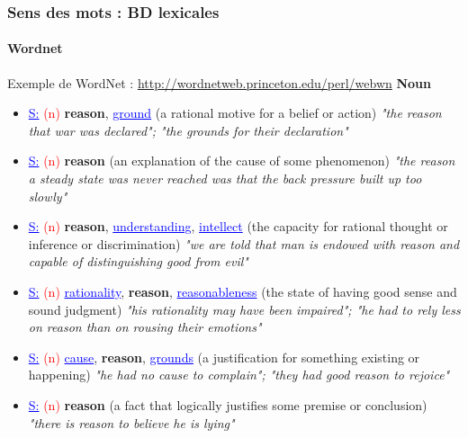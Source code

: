 \documentclass[xcolor=table]{beamer}
\begin{document}
\begin{frame}
\frametitle{Sens des mots : BD lexicales}
\framesubtitle{Wordnet}

\vspace{-6pt}
\begin{exampleblock}{Exemple de WordNet : \small\url{http://wordnetweb.princeton.edu/perl/webwn}}
	\fontsize{6}{6}\selectfont
	{\small\bfseries Noun}
	\begin{itemize}
		\item \textcolor{blue}{\underline{S:}} \textcolor{red}{(n)} \textbf{reason}, \textcolor{blue}{\underline{ground}} (a rational motive for a belief or action) \textit{"the reason that war was declared"; "the grounds for their declaration"}
		\item \textcolor{blue}{\underline{S:}} \textcolor{red}{(n)} \textbf{reason} (an explanation of the cause of some phenomenon) \textit{"the reason a steady state was never reached was that the back pressure built up too slowly"}
		\item \textcolor{blue}{\underline{S:}} \textcolor{red}{(n)} \textbf{reason}, \textcolor{blue}{\underline{understanding}}, \textcolor{blue}{\underline{intellect}} (the capacity for rational thought or inference or discrimination) \textit{"we are told that man is endowed with reason and capable of distinguishing good from evil"}
		\item \textcolor{blue}{\underline{S:}} \textcolor{red}{(n)} \textcolor{blue}{\underline{rationality}}, \textbf{reason}, \textcolor{blue}{\underline{reasonableness}} (the state of having good sense and sound judgment) \textit{"his rationality may have been impaired"; "he had to rely less on reason than on rousing their emotions"}
		\item \textcolor{blue}{\underline{S:}} \textcolor{red}{(n)} \textcolor{blue}{\underline{cause}}, \textbf{reason}, \textcolor{blue}{\underline{grounds}} (a justification for something existing or happening) \textit{"he had no cause to complain"; "they had good reason to rejoice"}
		\item \textcolor{blue}{\underline{S:}} \textcolor{red}{(n)} \textbf{reason} (a fact that logically justifies some premise or conclusion) \textit{"there is reason to believe he is lying"}
	\end{itemize}
	

\end{exampleblock}
\end{frame}
\end{document}
